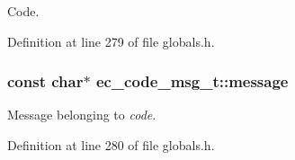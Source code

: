 \-Code. 



\-Definition at line 279 of file globals.\-h.

\subsubsection[{message}]{\setlength{\rightskip}{0pt plus 5cm}const char$\ast$ {\bf ec\-\_\-code\-\_\-msg\-\_\-t\-::message}}\label{structec__code__msg__t_a9b1fef025e25828a20170a275c5976e3}


\-Message belonging to {\itshape code\/}. 



\-Definition at line 280 of file globals.\-h.

